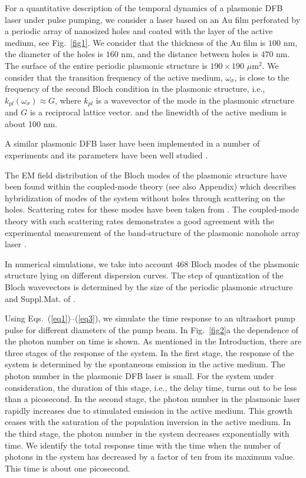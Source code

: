 \documentclass[aps,pra,amsmath,amssymb,onecolumn,superscriptaddress,showpacs,floatfix,]{revtex4-1}
\begin{document}
For a quantitative description of the temporal dynamics of a plasmonic DFB laser under pulse pumping, we consider a laser based on an Au film perforated by a periodic array of nanosized holes and coated with the layer of the active medium, see Fig.~\ref{fig1}. We consider that the thickness of the Au film is $100$ $\text{nm}$, the diameter of the holes is $160$ $\text{nm}$, and the distance between holes is $470$ $\text{nm}$. The surface of the entire periodic plasmonic structure is $190 \times 190$ $\mu \text{m}^2$. We consider that the transition frequency of the active medium, $\omega_\sigma$, is close to the frequency of the second Bloch condition in the plasmonic structure, i.e., $k_{pl}(\omega_{\sigma}) \approx G$, where $k_{pl}$ is a wavevector of the mode in the plasmonic structure and $G$ is a reciprocal lattice vector. \cite{TennerJOpt,TennerACSPhot,nefedkin2018acsphot} and the linewidth of the active medium is about 100 nm.

A similar plasmonic DFB laser have been implemented in a number of experiments \cite{BeijnumPRL,TennerJOpt,TennerACSPhot} and its parameters have been well studied \cite{BeijnumPRL,TennerJOpt,TennerACSPhot,nefedkin2018acsphot}.

The EM field distribution of the Bloch modes of the plasmonic structure have been found within the coupled-mode theory \cite{TennerJOpt,TennerACSPhot,nefedkin2018acsphot} (see also Appendix) which describes hybridization of modes of the system without holes through scattering on the holes. Scattering rates for these modes have been taken from \cite{TennerJOpt,TennerACSPhot}. The coupled-mode theory with such scattering rates demonstrates a good agreement with the experimental measurement of the band-structure of the plasmonic nanohole array laser \cite{TennerJOpt,TennerACSPhot}.

In numerical simulations, we take into account $468$ Bloch modes of the plasmonic structure lying on different dispersion curves. The step of quantization of the Bloch wavevectors is determined by the size of the periodic plasmonic structure \cite{nefedkin2018acsphot} and Suppl.Mat. of \cite{nefedkin2018acsphot}.

Using Eqs.~(\ref{eq1})--(\ref{eq3}), we simulate the time response to an ultrashort pump pulse for different diameters of the pump beam.
In Fig.~\ref{fig2}a the dependence of the photon number on time is shown.
As mentioned in the Introduction, there are three stages of the response of the system.
In the first stage, the response of the system is determined by the spontaneous emission in the active medium.
The photon number in the plasmonic DFB laser is small.
For the system under consideration, the duration of this stage, i.e., the delay time, turns out to be less than a picosecond.
In the second stage, the photon number in the plasmonic laser rapidly increases due to stimulated emission in the active medium.
This growth ceases with the saturation of the population inversion in the active medium.
In the third stage, the photon number in the system decreases exponentially with time.
We identify the total response time with the time when the number of photons in the system has decreased by a factor of ten from its maximum value.
This time is about one picosecond.
  
\end{document}
